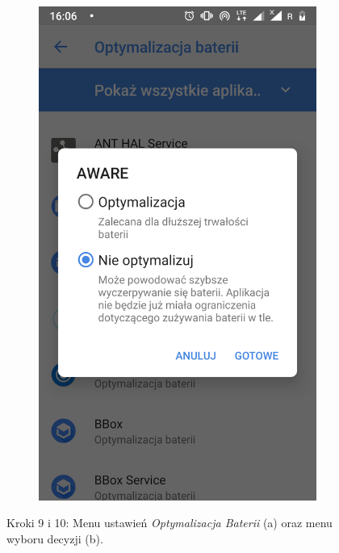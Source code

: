 \begin{enumerate}
\begin{figure}[H]
\begin{subfigure}{0.35\textwidth}
			\subcaption{\label{subfigure_a}}
		\end{subfigure}
		\begin{subfigure}{0.35\textwidth}
			\centering
			\includegraphics[scale=0.14]{dodatekA/3_10.png}
			\subcaption{\label{subfigure_b}}
		\end{subfigure}
		\caption{ Kroki 9 i 10: Menu ustawień \textit{Optymalizacja Baterii} (a) oraz menu wyboru decyzji (b).}
	\end{figure}
	\clearpage 
 
\end{enumerate}


